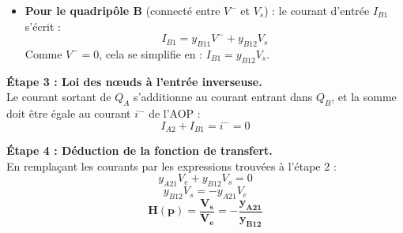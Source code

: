 \documentclass[11pt, a4paper]{article}
\begin{document}
\begin{minipage}[t]{0.45\textwidth}
{\begin{itemize}
    \item \textbf{Pour le quadripôle B} (connecté entre $V^-$ et $V_s$) : le courant d'entrée $I_{B1}$ s'écrit :
    $$ I_{B1} = y_{B11} V^- + y_{B12} V_s $$
    Comme $V^- = 0$, cela se simplifie en : $I_{B1} = y_{B12} V_s$.
\end{itemize}

\textbf{Étape 3 : Loi des nœuds à l'entrée inverseuse.}\\
Le courant sortant de $Q_A$ s'additionne au courant entrant dans $Q_B$, et la somme doit être égale au courant $i^-$ de l'AOP :
$$ I_{A2} + I_{B1} = i^- = 0 $$

\textbf{Étape 4 : Déduction de la fonction de transfert.}\\
En remplaçant les courants par les expressions trouvées à l'étape 2 :
$$ y_{A21} V_e + y_{B12} V_s = 0 $$
$$ y_{B12} V_s = - y_{A21} V_e $$
$$ \mathbf{H(p) = \frac{V_s}{V_e} = -\frac{y_{A21}}{y_{B12}}} $$
}
\end{minipage}
\hfill
\end{document}
